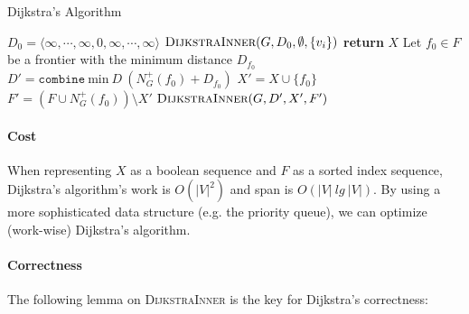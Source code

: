 \documentclass[11pt,a4paper,oneside,microtype,nokorean]{oblivoir}
\begin{document}
\begin{algorithm}
  \caption{Dijkstra's Algorithm}\label{dijkstra}
  \begin{algorithmic}[1]
     
    \State $D_0 = \langle \infty, \cdots, \infty, 0, \infty, \cdots, \infty \rangle$ 
    \State $\Call{DijkstraInner}{G,D_0,\emptyset,\{v_i\}}$
    \EndProcedure
    \Statex
     
    \State \textbf{return} $X$
    \EndIf
    \State Let $f_0 \in F$ be a frontier with the minimum distance $D_{f_0}$
    \State $D' = \texttt{combine}~\textrm{min}~D~(N^+_G(f_0) + D_{f_0})$ 
    \State $X' = X \cup \{f_0\}$
    \State $F' = (F \cup N^+_G(f_0)) \setminus X'$
    \State $\Call{DijkstraInner}{G,D',X',F'}$
    \EndProcedure
  \end{algorithmic}
\end{algorithm}


\paragraph{Cost}

When representing $X$ as a boolean sequence and $F$ as a sorted index sequence, Dijkstra's
algorithm's work is $O(|V|^2)$ and span is $O(|V|~lg~|V|)$.  By using a more sophisticated data
structure (e.g. the priority queue), we can optimize (work-wise) Dijkstra's algorithm.



\paragraph{Correctness} The following lemma on \textsc{DijkstraInner} is the key for Dijkstra's
correctness:
\end{document}
